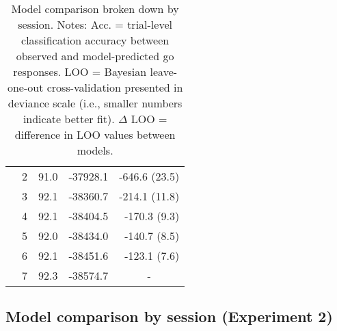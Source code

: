 \documentclass[a4paper,12pt]{article}
\begin{document}
\begin{refsection}[supp]
\begin{table}[h!]
\begin{tabular}{lcccr}
         & 2 & 91.0 & -37928.1 & -646.6 (23.5) \\
         & 3 & 92.1 & -38360.7 & -214.1 (11.8) \\
         & 4 & 92.1 & -38404.5 & -170.3 (9.3) \\
         & 5 & 92.0 & -38434.0 & -140.7 (8.5) \\
         & 6 & 92.1 & -38451.6 & -123.1 (7.6) \\
         & 7 & 92.3 & -38574.7 & \multicolumn{1}{c}{-} \\
         \bottomrule
    \end{tabular}
    \caption{Model comparison broken down by session. Notes: Acc. = trial-level classification accuracy between observed and model-predicted go responses. LOO = Bayesian leave-one-out cross-validation presented in deviance scale (i.e., smaller numbers indicate better fit). $\Delta$ LOO = difference in LOO values between models.}
    \label{tab:exp1_mc_full}
\end{table}

\clearpage
\subsection*{Model comparison by session (Experiment 2)}


\end{refsection}
\end{document}
